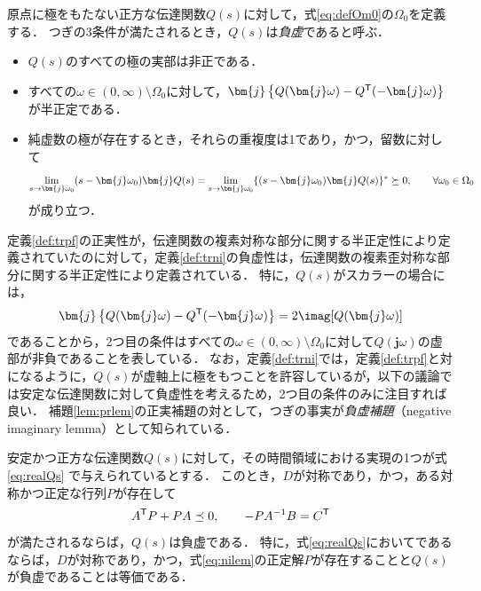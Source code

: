 \documentclass[a4j,10pt,oneside,openany,dvipdfmx]{jsbook}
\begin{document}
\begin{definition}\label{def:trni}
原点に極をもたない正方な伝達関数$Q(s)$に対して，式\eqref{eq:defOm0}の$\Omega_0$を定義する．
つぎの3条件が満たされるとき，$Q(s)$は\emph{負虚}であると呼ぶ．
\begin{itemize}
\item $Q(s)$のすべての極の実部は非正である．
\item すべての$\omega \in (0,\infty)\setminus \Omega_0$に対して，$\bm{j}\left\{Q(\bm{j} \omega) - Q^{\sf T}(-\bm{j} \omega) \right\}$が半正定である．
\item 純虚数の極が存在するとき，それらの重複度は1であり，かつ，留数に対して
\[
\lim_{s \rightarrow \bm{j} \omega_0} (s-\bm{j} \omega_0) \bm{j} Q(s) = 
\lim_{s\rightarrow \bm{j} \omega_0} \{ (s-\bm{j} \omega_0) \bm{j} Q(s)\}^{\sf *}\succeq 0
,\qquad
\forall \omega_0 \in \Omega_0
\]
が成り立つ．
\end{itemize}
\end{definition}

定義\ref{def:trpf}の正実性が，伝達関数の複素対称な部分に関する半正定性により定義されていたのに対して，定義\ref{def:trni}の負虚性は，伝達関数の複素歪対称な部分に関する半正定性により定義されている．
特に，$Q(s)$がスカラーの場合には，
\[
\bm{j}\left\{Q(\bm{j} \omega) - Q^{\sf T}(-\bm{j} \omega) \right\}
= 2 \imag[Q(\bm{j} \omega)]
\]
であることから，2つ目の条件はすべての$\omega \in (0,\infty)\setminus \Omega_0$に対して$Q(\bm{j}\omega)$の虚部が非負であることを表している．
なお，定義\ref{def:trni}では，定義\ref{def:trpf}と対になるように，$Q(s)$が虚軸上に極をもつことを許容しているが，以下の議論では安定な伝達関数に対して負虚性を考えるため，2つ目の条件のみに注目すれば良い．
補題\ref{lem:prlem}の正実補題の対として，つぎの事実が\emph{負虚補題}（negative imaginary lemma）として知られている．

\begin{lemma}\label{lem:nilem}
安定かつ正方な伝達関数$Q(s)$に対して，その時間領域における実現の1つが式\eqref{eq:realQs}
で与えられているとする．
このとき，$D$が対称であり，かつ，ある対称かつ正定な行列$P$が存在して
\begin{equation}\label{eq:nilem}
A^{\sf T}P+PA \preceq 0
,\qquad
-PA^{-1}B = C^{\sf T}
\end{equation}
が満たされるならば，$Q(s)$は負虚である．
特に，式\eqref{eq:realQs}においてであるならば，$D$が対称であり，かつ，式\eqref{eq:nilem}の正定解$P$が存在することと$Q(s)$が負虚であることは等価である．
\end{lemma}
\end{document}
